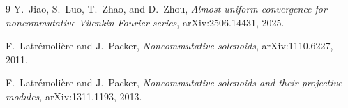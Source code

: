 \documentclass[11pt]{article}
\theoremstyle{definition}
\theoremstyle{remark}
\newcommand{\1}{\mathbf 1}
\begin{document}
\begin{thebibliography}{9}
Y.~Jiao, S.~Luo, T.~Zhao, and D.~Zhou,
\emph{Almost uniform convergence for noncommutative Vilenkin-Fourier series},
arXiv:2506.14431, 2025.

F.~Latr\'emoli\`ere and J.~Packer,
\emph{Noncommutative solenoids}, arXiv:1110.6227, 2011.

F.~Latr\'emoli\`ere and J.~Packer,
\emph{Noncommutative solenoids and their projective modules},
arXiv:1311.1193, 2013.
\end{thebibliography}
\end{document}
